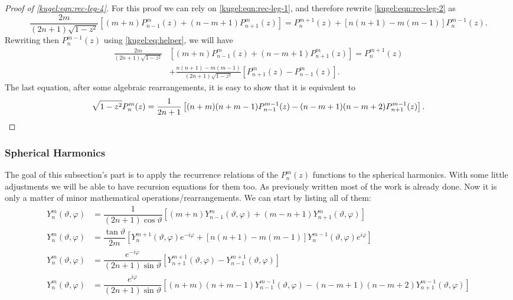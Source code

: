 \begin{proof}[Proof of \eqref{kugel:eqn:rec-leg-4}]
  For this proof we can rely on \eqref{kugel:eqn:rec-leg-1}, and therefore
  rewrite \eqref{kugel:eqn:rec-leg-2} as 
  \begin{equation*}
    \frac{2m}{(2n+1)\sqrt{1-z^2}} \left[
      (m+n)P^m_{n-1}(z) + (n-m+1)P^m_{n+1}(z)
    \right] = P^{m+1}_n(z) + [ n(n+1)-m(m-1) ]P^{m-1}_n(z).
  \end{equation*}
  Rewriting then $P^{m-1}_n(z)$ using \eqref{kugel:eq:helper}, we will have
  \begin{align*}
    \frac{2m}{(2n+1)\sqrt{1-z^2}}
      &\left[ (m+n)P^m_{n-1}(z) + (n-m+1)P^m_{n+1}(z) \right] = P^{m+1}_n(z) \\
      &+ \frac{n(n+1)-m(m-1)}{(2n+1)\sqrt{1-z^2}} \left[
          P^m_{n+1}(z)-P^m_{n-1}(z)
        \right].
  \end{align*}
  The last equation, after some algebraic rearrangements, it is easy to show
  that it is equivalent to
  \begin{equation*}
    \sqrt{1-z^2} P^m_n(z) = \dfrac{1}{2n+1} \left[
      (n+m)(n+m-1)P^{m-1}_{n-1}(z) - (n-m+1)(n-m+2)P^{m-1}_{n+1}(z)
    \right].
    \qedhere
  \end{equation*}
\end{proof}

\subsubsection{Spherical Harmonics}

The goal of this subsection's part is to apply the recurrence relations of the
$P^m_n(z)$ functions to the spherical harmonics.  With some little adjustments
we will be able to have recursion equations for them too. As previously written
most of the work is already done. Now it is only a matter of minor mathematical
operations/rearrangements. We can start by listing all of them:
\begin{subequations}
  \begin{align}
  Y^m_n(\vartheta, \varphi) &= \dfrac{1}{(2n+1)\cos \vartheta} \left[
      (m+n)Y^m_{n-1}(\vartheta, \varphi)
      + (m-n+1)Y^m_{n+1}(\vartheta, \varphi)
    \right] \label{kugel:eqn:rec-sph-harm-1} \\
  Y^m_n(\vartheta, \varphi) &= \dfrac{\tan \vartheta}{2m}\left[
      Y^{m+1}_n(\vartheta, \varphi)e^{-i\varphi}
      + [n(n+1)-m(m-1)]Y^{m-1}_n(\vartheta, \varphi)e^{i\varphi}
    \right] \label{kugel:eqn:rec-sph-harm-2} \\
  Y^m_n(\vartheta, \varphi) &= \dfrac{e^{-i\varphi}}{ (2n+1)\sin \vartheta}
    \left[
      Y^{m+1}_{n+1}(\vartheta, \varphi)
      - Y^{m+1}_{n-1}(\vartheta, \varphi)
    \right] \label{kugel:eqn:rec-sph-harm-3} \\
  Y^m_n(\vartheta, \varphi) &= \dfrac{e^{i\varphi}}{(2n+1)\sin \vartheta}
    \left[
      (n+m)(n+m-1)Y^{m-1}_{n-1}(\vartheta, \varphi)
      - (n-m+1)(n-m+2)Y^{m-1}_{n+1}(\vartheta, \varphi)
    \right] \label{kugel:eqn:rec-sph-harm-4} 
  \end{align}
\end{subequations}

